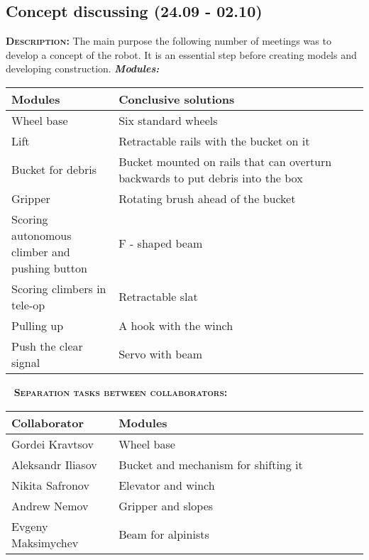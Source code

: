 \subsection{Concept discussing (24.09 - 02.10)}
	\textsc{\textbf{Description:}} The main purpose the following number of meetings was to develop a concept of the robot. It is an essential step before creating models and developing construction.\newline \newline
	\textit{\textbf{Modules:}}
	
	\begin{table}[H]
		\vspace{-2mm}
		\begin{center}
			\begin{tabular}{|p{0.3\linewidth}|p{0.7\linewidth}|}
				\hline
				Modules & Conclusive solutions \\
				\hline
				Wheel base & Six standard wheels \\
				\hline
				Lift & Retractable rails with the bucket on it \\
				\hline
				Bucket for debris & Bucket mounted on rails that can overturn backwards to put debris into the box \\
				\hline
				Gripper & Rotating brush ahead of the bucket \\
				\hline
				Scoring autonomous climber and pushing button & F - shaped beam \\
				\hline
				Scoring climbers in tele-op & Retractable slat \\
				\hline
				Pulling up & A hook with the winch \\
				\hline
				Push the clear signal & Servo with beam \\
				\hline
			\end{tabular}
		\end{center}
	\end{table}
	\vspace{-10mm}
	 \newline
	\textsc{\textbf{Separation tasks between collaborators:}}
	
	\begin{table}[H]
		\vspace{-2mm}
		\begin{center}
			\begin{tabular}{|p{0.3\linewidth}|p{0.7\linewidth}|}
				\hline
				Collaborator & Modules \\
				\hline
				Gordei Kravtsov & Wheel base \\
				\hline
				Aleksandr Iliasov & Bucket and mechanism for shifting it \\
				\hline
				Nikita Safronov & Elevator and winch \\
				\hline
				Andrew Nemov & Gripper and slopes \\
				\hline
				Evgeny Maksimychev & Beam for alpinists \\
				\hline
			\end{tabular}
		\end{center}
	\end{table}
  
